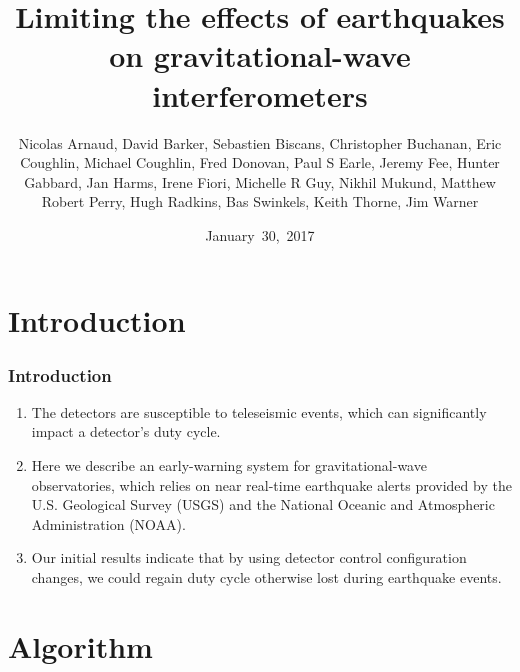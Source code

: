 \documentclass[ignorenonframetext,t,10pt]{beamer}
\title[Limiting the effects of earthquakes on gravitational-wave interferometers]{Limiting the effects of earthquakes on gravitational-wave interferometers}
\author[M.~Coughlin]{Nicolas Arnaud, David Barker, Sebastien Biscans, Christopher Buchanan, Eric Coughlin, Michael Coughlin, Fred Donovan, Paul S Earle, Jeremy Fee, Hunter Gabbard, Jan Harms, Irene Fiori, Michelle R Guy, Nikhil Mukund, Matthew Robert Perry, Hugh Radkins, Bas Swinkels, Keith Thorne, Jim Warner}
\date[]{January~30,~2017}
\begin{document}
\maketitle

\begin{frame}
\titlepage
\end{frame}

\section{Introduction}

\begin{frame}
\frametitle{Introduction}

  \begin{enumerate}
  \item The detectors are susceptible to teleseismic events, which can significantly impact a detector's duty cycle. 
  \item Here we describe an early-warning system for gravitational-wave observatories, which relies on near real-time earthquake alerts provided by the U.S. Geological Survey (USGS) and the National Oceanic and Atmospheric Administration (NOAA).
  \item Our initial results indicate that by using detector control configuration changes, we could regain duty cycle otherwise lost during earthquake events.
  \end{enumerate}
\end{frame}

\section{Algorithm}
\end{document}

